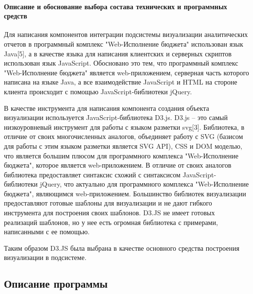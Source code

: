 \documentclass[a4paper]{extarticle}
\numberwithin{equation}{section}
\begin{document}
\paragraph{Описание и обоснование выбора состава технических и программных средств}
Для написания компонентов интеграции подсистемы визуализации аналитических отчетов в программный комплекс "Web-Исполнение бюджета" использован язык Java[5], а в качестве языка для написания клиентских и серверных скриптов использован язык JavaScript. Обосновано это тем, что программный комплекс "Web-Исполнение бюджета" является web-приложением, серверная часть которого написана на языке Java, а все взаимодействие JavaScript и HTML на стороне клиента происходит с помощью JavaScript-библиотеки jQuery.\par
В качестве инструмента для написания компонента создания объекта визуализации используется JavaScript-библиотека D3.js. D3.js – это самый низкоуровневый инструмент для работы с языком разметки svg[3]. Библиотека, в отличие от своих многочисленных аналогов, объединяет работу с SVG (базисом для работы с этим языком разметки является SVG API), CSS и DOM моделью, что является большим плюсом для программного комплекса "Web-Исполнение бюджета", которое является web-приложением. В отличие от своих аналогов библиотека предоставляет синтаксис схожий с синтаксисом JavaScript-библиотеки jQuery, что актуально для программного комплекса "Web-Исполнение бюджета", являющимся web-приложением. Большинство библиотек визуализации предоставляют готовые шаблоны для визуализации и не дают гибкого инструмента для построения своих шаблонов. D3.JS не имеет готовых реализаций шаблонов, но у нее есть огромная библиотека с примерами, написанными с ее помощью.\par
Таким образом D3.JS была выбрана в качестве основного средства построения визуализации в подсистеме.

\subsection{Описание программы}
\end{document}
